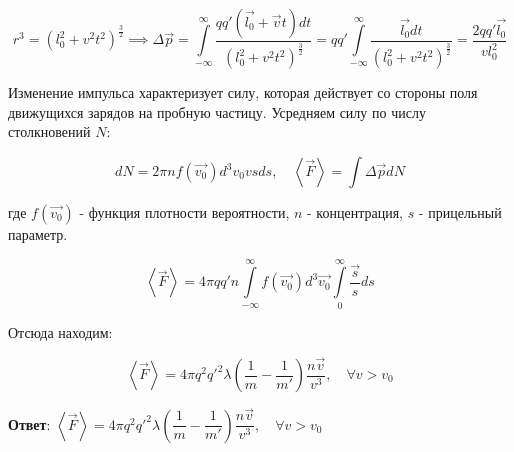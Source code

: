 \documentclass[a4paper,12pt]{article}
\begin{document}
	\begin{equation}
		r^3 = \left(l_0^2 + v^2 t^2\right)^{\frac{3}{2}} \implies \Delta \vec{p} = \displaystyle\int\limits_{-\infty}^{\infty} \dfrac{qq' (\vec{l_0} + \vec{v}t) dt}{\left(l_0^2 + v^2 t^2\right)^{\frac{3}{2}}} = qq'\displaystyle\int\limits_{-\infty}^{\infty} \dfrac{\vec{l_0}dt}{\left(l_0^2 + v^2 t^2 \right)^{\frac{3}{2}} } = \dfrac{2qq'\vec{l_0}}{v l_0^2}
	\end{equation}
	
	\quad Изменение импульса характеризует силу, которая действует со стороны поля движущихся зарядов на пробную частицу. Усредняем силу по числу столкновений $N$:
	
	\begin{equation}
		dN = 2\pi nf(\vec{v_0}) d^3 v_0 v sds, \quad \left<\vec{F}\right> = \displaystyle\int \Delta \vec{p} dN 
	\end{equation}
	
	\quad где $f(\vec{v_0})$ - функция плотности вероятности, $n$ - концентрация, $s$ - прицельный параметр.
	
	\begin{equation}
		\left<\vec{F}\right> = 4\pi qq' n \displaystyle\int\limits_{-\infty}^{\infty} f(\vec{v_0}) d^3 \vec{v_0} \displaystyle\int\limits_{0}^{\infty} \dfrac{\vec{s}}{s}ds
	\end{equation}
	
	\quad Отсюда находим: 
	
	\begin{equation}
		\left<\vec{F}\right> = 4\pi q^2 q'^2\lambda \left(\dfrac{1}{m} - \dfrac{1}{m'}\right) \dfrac{n\vec{v}}{v^3}, \quad \forall v > v_0
	\end{equation}
	
	\quad \textbf{Ответ}: $\left<\vec{F}\right> = 4\pi q^2 q'^2\lambda \left(\dfrac{1}{m} - \dfrac{1}{m'}\right) \dfrac{n\vec{v}}{v^3}, \quad \forall v > v_0$
\end{document}
